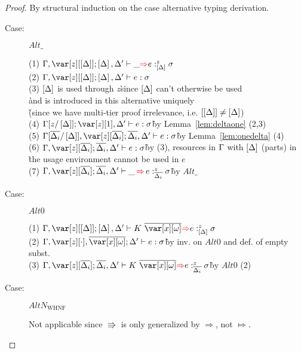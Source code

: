 
\irrelevancelemma*

\begin{proof}
By structural induction on the case alternative typing derivation.

\begin{description}

\item[Case:] $Alt\_$
\begin{tabbing}
    (1) $\G,\z[\irr{\D}];\irr{\D}, \D' \vdash \_ \ROUNDTWO{\Rightarrow} e :^z_{\irr{\D}} \s $\\
    (2) $\G, \z[\irr{\D}];\irr{\D},\D' \vdash e : \s$\\
    (3) $\left[\Delta\right]$ is used through $z$\`since $\left[\Delta\right]$ can't otherwise be used\\\`and is introduced in this alternative uniquely \\\`(since we have multi-tier proof irrelevance, i.e. $\left[\left[\Delta\right]\right]\neq\left[\Delta\right]$)\\
    (4) $\G[z/\irr{\D}]; \z[1], \D' \vdash e : \s$\` by Lemma~\ref{lem:deltaone} (2,3)\\
    (5) $\G[\ov{\D_i}/\irr{\D}], \z[\ov{\D_i}]; \ov{\D_i}, \D' \vdash e : \s$\` by Lemma~\ref{lem:onedelta} (4)\\
    (6) $\G, \z[\ov{\D_i}]; \ov{\D_i}, \D' \vdash e : \s$\` by (3), resources in $\Gamma$ with $\left[\Delta\right]$ (parts) in\\\` the usage environment cannot be used in $e$\\
    (7) $\G, \z[\ov{\D_i}]; \ov{\D_i}, \D' \vdash \_ \,\ROUNDTWO{\Rightarrow}\, e :^z_{\ov{\D_i}} \s $\` by $Alt\_$\\
\end{tabbing}

\item[Case:] $Alt0$
\begin{tabbing}
    (1) $\G, \z[\irr{\D}]; \irr{\D}, \D' \vdash K~\ov{\xo}\ROUNDTWO{\Rightarrow} e :^z_{\irr{\D}} \s $\\
    (2) $\G, \z[\cdot], \ov{\xo}; \D' \vdash e : \s$\` by inv. on $Alt0$ and def. of empty subst.\\
    (3) $\G, \z[\ov{\D_i}]; \ov{\D_i}, \D' \vdash K~\ov{\xo}\ROUNDTWO{\Rightarrow} e :^z_{\ov{\D_i}} \s $\` by $Alt0$ (2)\\
\end{tabbing}

\item[Case:] $AltN_{\textrm{WHNF}}$
\begin{tabbing}
    Not applicable since $\Rrightarrow$ is only generalized by $\Rightarrow$, not $\Mapsto$.
\end{tabbing}


\end{description}
\end{proof}
